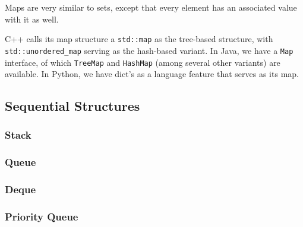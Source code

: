 Maps are very similar to sets, except that every element has an associated value with it as well.

C++ calls its map structure a \texttt{std::map} as the tree-based structure, with \texttt{std::unordered_map} serving as the hash-based variant. In Java, we have a \texttt{Map} interface, of which \texttt{TreeMap} and \texttt{HashMap} (among several other variants) are available. In Python, we have dict's as a language feature that serves as its map.

\subsection{Sequential Structures}
\subsubsection{Stack}
\subsubsection{Queue}
\subsubsection{Deque}
\subsubsection{Priority Queue}